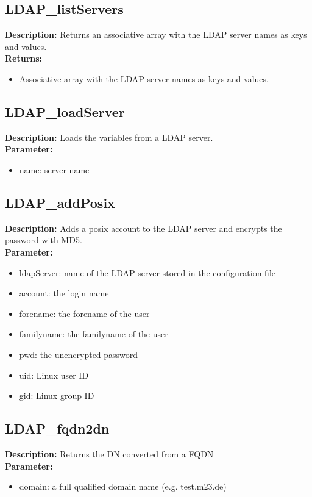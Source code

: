 \subsection{LDAP\_listServers}
\textbf{Description:} Returns an associative array with the LDAP server names as keys and values.\\
\textbf{Returns:}
\begin{itemize}
\item Associative array with the LDAP server names as keys and values.
\end{itemize}

\subsection{LDAP\_loadServer}
\textbf{Description:} Loads the variables from a LDAP server.\\
\textbf{Parameter:}
\begin{itemize}
\item name: server name
\end{itemize}

\subsection{LDAP\_addPosix}
\textbf{Description:} Adds a posix account to the LDAP server and encrypts the password with MD5.\\
\textbf{Parameter:}
\begin{itemize}
\item ldapServer: name of the LDAP server stored in the configuration file
\item account: the login name
\item forename: the forename of the user
\item familyname: the familyname of the user
\item pwd: the unencrypted password
\item uid: Linux user ID
\item gid: Linux group ID
\end{itemize}

\subsection{LDAP\_fqdn2dn}
\textbf{Description:} Returns the DN converted from a FQDN\\
\textbf{Parameter:}
\begin{itemize}
\item domain: a full qualified domain name (e.g. test.m23.de)
\end{itemize}

